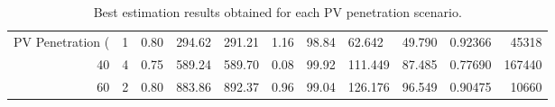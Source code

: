 \begin{table}
\caption{Best estimation results obtained for each PV penetration scenario.}
\label{tab:best_results}
\begin{tabular}{rrllllllllr}
\toprule
PV Penetration (%
\midrule
20 & 1 & 0.80 & 294.62 & 291.21 & 1.16 & 98.84 & 62.642 & 49.790 & 0.92366 & 45318 \\
40 & 4 & 0.75 & 589.24 & 589.70 & 0.08 & 99.92 & 111.449 & 87.485 & 0.77690 & 167440 \\
60 & 2 & 0.80 & 883.86 & 892.37 & 0.96 & 99.04 & 126.176 & 96.549 & 0.90475 & 10660 \\
\bottomrule
\end{tabular}
\end{table}

